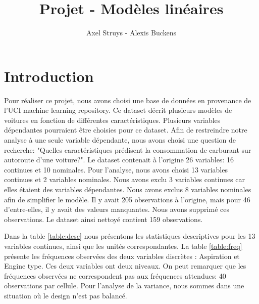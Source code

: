 \documentclass[12pt,a4paper,twoside]{article}
\author{Axel Struys - Alexis Buckens}
\title{Projet - Modèles linéaires}
\begin{document}
\maketitle
\section{Introduction}
Pour réaliser ce projet, nous avons choisi une base de données en provenance de l'UCI machine learning repository.
Ce dataset décrit plusieurs modèles de voitures en fonction de différentes caractéristiques. Plusieurs variables dépendantes pourraient être choisies pour ce dataset. Afin de restreindre notre analyse à une seule variable dépendante, nous avons choisi une question de recherche: "Quelles caractéristiques prédisent la consommation de carburant sur autoroute d'une voiture?".
Le dataset contenait à l'origine 26 variables: 16 continues et 10 nominales. Pour l'analyse, nous avons choisi 13 variables continues et 2 variables nominales. Nous avons exclu 3 variables continues car elles étaient des variables dépendantes. Nous avons exclus 8 variables nominales afin de simplifier le modèle.
Il y avait 205 observations à l'origine, mais pour 46 d'entre-elles, il y avait des valeurs manquantes. Nous avons supprimé ces observations. Le dataset ainsi nettoyé contient 159 observations.

Dans la table \ref{table:desc} nous présentons les statistiques descriptives pour les 13 variables continues, ainsi que les unités correspondantes. La table \ref{table:freq} présente les fréquences observées des deux variables discrètes : Aspiration et Engine type. Ces deux variables ont deux niveaux. On peut remarquer que les fréquences observées ne correspondent pas aux fréquences attendues: 40 observations par cellule. Pour l'analyse de la variance, nous sommes dans une situation où le design n'est pas balancé.
\end{document}
